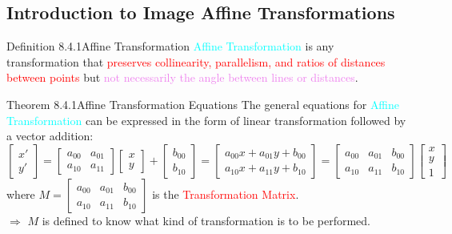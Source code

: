 \documentclass{book}
\begin{document}
\subsection{Introduction to Image Affine Transformations}
\begin{defBox}{Definition 8.4.1}{Affine Transformation}
    \textcolor{cyan}{Affine Transformation} is any transformation that \textcolor{red}{preserves collinearity, parallelism, and ratios of distances between points} but \textcolor{violet}{not necessarily the angle between lines or distances}.
\end{defBox}
\begin{thmBox}{Theorem 8.4.1}{Affine Transformation Equations}
    The general equations for \textcolor{cyan}{Affine Transformation} can be expressed in the form of linear transformation followed by a vector addition:
    \[
        \begin{bmatrix}
            x' \\ y'
        \end{bmatrix} = \begin{bmatrix}
            a_{00} & a_{01} \\ a_{10} & a_{11}
        \end{bmatrix} \begin{bmatrix}
            x \\ y
        \end{bmatrix} + \begin{bmatrix}
            b_{00} \\ b_{10}
        \end{bmatrix} = \begin{bmatrix}
            a_{00}x + a_{01}y + b_{00} \\ a_{10}x + a_{11}y + b_{10}
        \end{bmatrix} = \begin{bmatrix}
            a_{00} & a_{01} & b_{00} \\ a_{10} & a_{11} & b_{10}
        \end{bmatrix} \begin{bmatrix}
            x \\ y \\ 1
        \end{bmatrix}
    \]
    where \(M = \begin{bmatrix}
        a_{00} & a_{01} & b_{00} \\ a_{10} & a_{11} & b_{10}
    \end{bmatrix} \) is the \textcolor{red}{Transformation Matrix}.\\
    $\Rightarrow$ $M$ is defined to know what kind of transformation is to be performed.
\end{thmBox}
\end{document}
